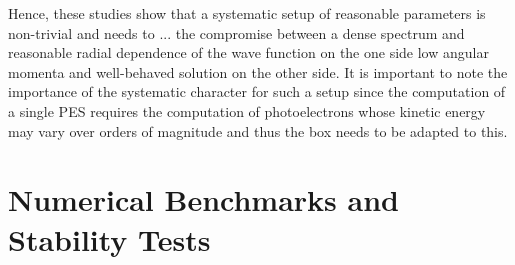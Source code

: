 Hence, these studies show that a systematic setup of reasonable parameters is non-trivial and needs to ... the compromise between a dense spectrum and reasonable radial dependence of the wave function on the one side low angular momenta and well-behaved solution on the other side.
It is important to note the importance of the systematic character for such a setup since the computation of a single PES requires the computation of photoelectrons whose kinetic energy may vary over orders of magnitude and thus the box needs to be adapted to this.


\section{Numerical Benchmarks and Stability Tests}
